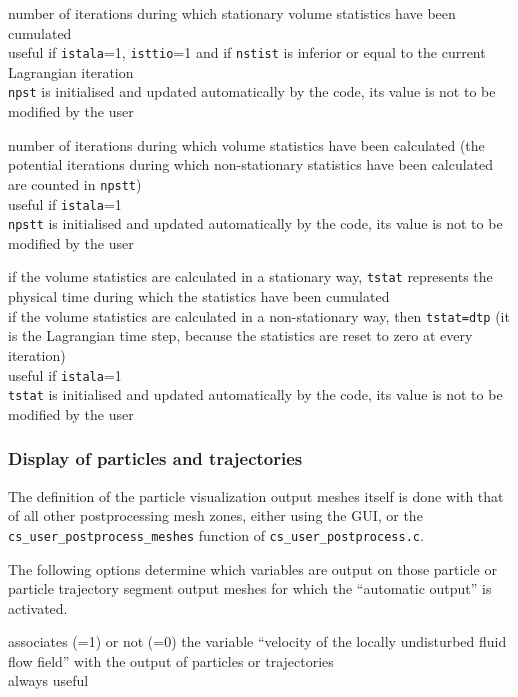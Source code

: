 {number of iterations during which stationary volume statistics have
been cumulated\\
useful if \texttt{istala}=1, \texttt{isttio}=1 and if \texttt{nstist} is
inferior or equal to the current Lagrangian iteration\\
\texttt{npst} is initialised and updated automatically by the code, its
value is not to be modified by the user}

{number of iterations during which volume statistics have been
calculated (the potential iterations during which non-stationary
statistics have been calculated are counted in \texttt{npstt})\\
useful if \texttt{istala}=1\\
\texttt{npstt} is initialised and updated automatically by the code,
its value is not to be modified by the user}

{if the volume statistics are calculated in a stationary way, \texttt{tstat}
represents the physical time during which the statistics have been cumulated\\
if the volume statistics are calculated in a non-stationary way,
then \texttt{tstat=dtp} (it is the Lagrangian time step, because the
statistics are reset to zero at every iteration)\\
useful if \texttt{istala}=1\\
\texttt{tstat} is initialised and updated automatically by the code,
its value is not to be modified by the user}

\subsubsection{Display of particles and trajectories}

The definition of the particle visualization output meshes
itself is done with that of all other postprocessing mesh zones, either
using the GUI, or the \texttt{cs\_user\_postprocess\_meshes} function of
\texttt{cs\_user\_postprocess.c}.

The following options determine which variables are output on those particle
or particle trajectory segment output meshes for which the ``automatic output''
is activated.

{associates (=1) or not (=0) the variable ``velocity of the locally
undisturbed fluid flow field'' with the output of particles or trajectories\\
always useful}

